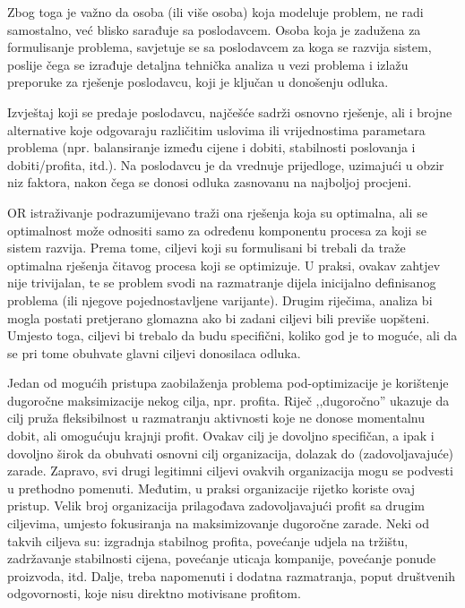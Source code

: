 \documentclass[b5paper, utf8, 11pt, colorlinks]{book}
\theoremstyle{definition}
\begin{document}
 Zbog toga je važno da osoba (ili više osoba) koja modeluje problem,  ne radi samostalno, već blisko sarađuje sa poslodavcem. Osoba koja je zadužena za formulisanje problema, savjetuje se sa poslodavcem za koga se razvija sistem, poslije čega se izrađuje detaljna tehnička analiza u vezi problema i izlažu preporuke za rješenje  poslodavcu, koji je ključan u donošenju odluka.   


 Izvještaj koji se predaje poslodavcu, najčešće sadrži osnovno rješenje, ali i brojne alternative koje odgovaraju različitim uslovima ili  vrijednostima parametara problema  (npr. balansiranje između cijene i dobiti, stabilnosti poslovanja i dobiti/profita, itd.). Na poslodavcu je da vrednuje prijedloge, uzimajući u obzir  niz faktora, nakon čega se donosi odluka zasnovanu na najboljoj procjeni. %


  OR istraživanje podrazumijevano traži  ona rješenja koja su optimalna, ali se optimalnost može odnositi samo za određenu komponentu procesa za koji se sistem razvija. Prema tome, ciljevi koji su formulisani bi trebali da traže optimalna rješenja čitavog procesa koji se optimizuje.  U praksi, ovakav zahtjev nije trivijalan, te se problem svodi na razmatranje dijela inicijalno definisanog problema (ili njegove pojednostavljene varijante). Drugim riječima, analiza bi mogla postati pretjerano glomazna ako bi zadani ciljevi bili previše uopšteni. Umjesto toga, ciljevi bi trebalo da budu specifični, koliko god je to moguće, ali da se pri tome obuhvate glavni ciljevi donosilaca odluka. 


 Jedan od mogućih pristupa zaobilaženja problema pod-optimizacije je korištenje dugoročne maksimizacije nekog cilja, npr. profita. Riječ ,,dugoročno'' ukazuje da cilj pruža fleksibilnost u razmatranju aktivnosti koje ne donose momentalnu dobit, ali   omogućuju krajnji profit. Ovakav cilj je dovoljno specifičan, a ipak i dovoljno širok da obuhvati osnovni cilj   organizacija, dolazak do (zadovoljavajuće) zarade. Zapravo, svi drugi legitimni ciljevi ovakvih organizacija mogu se podvesti u prethodno pomenuti. Međutim, u praksi   organizacije rijetko koriste ovaj pristup. Velik broj   organizacija prilagođava zadovoljavajući profit sa drugim ciljevima, umjesto fokusiranja na maksimizovanje dugoročne zarade. Neki od takvih ciljeva su: izgradnja stabilnog profita, povećanje udjela na tržištu, zadržavanje stabilnosti cijena, povećanje uticaja kompanije, povećanje ponude proizvoda, itd. 
 Dalje, treba napomenuti i dodatna razmatranja, poput društvenih odgovornosti, koje nisu direktno motivisane profitom.  
\end{document}
